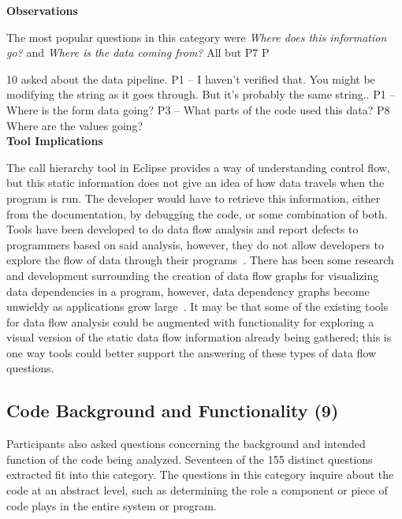 \documentclass[conference]{IEEEtran}
\begin{document}
\noindent\textbf{Observations}

The most popular questions in this category were \textit{Where does this information go?} and  \textit{Where is the data coming from?}
All but P7 P

10 asked about the data pipeline. 
P1 -- I haven't verified that. You might be modifying the string as it goes through. But it's probably the same string.. 
P1 -- Where is the form data going?
P3 -- What parts of the code used this data?
P8 Where are the values going?
\\

\noindent\textbf{Tool Implications}

The call hierarchy tool in Eclipse provides a way of understanding control flow, but this static information does not give an idea of how data travels when the program is run. 
The developer would have to retrieve this information, either from the documentation, by debugging the code, or some combination of both. 
Tools have been developed to do data flow analysis and report defects to programmers based on said analysis, however, they do not allow developers to explore the flow of data through their programs~\cite{jovanovic2006pixy}. 
There has been some research and development surrounding the creation of data flow graphs for visualizing data dependencies in a program, however, data dependency graphs become unwieldy as applications grow large~\cite{ghosh2001method, ferrante1987program}. 
It may be that some of the existing tools for data flow analysis could be augmented with functionality for exploring a visual version of the static data flow information already being gathered; this is one way tools could better support the answering of these types of data flow questions.
\\



\noindent\subsection{\textbf{Code Background and Functionality (9)}}
\label{cbf}


Participants also asked questions concerning the background and intended function of the code being analyzed. 
Seventeen of the 155 distinct questions extracted fit into this category. 
The questions in this category inquire about the code at an abstract level, such as determining the role a component or piece of code plays in the entire system or program.
\\
\end{document}
